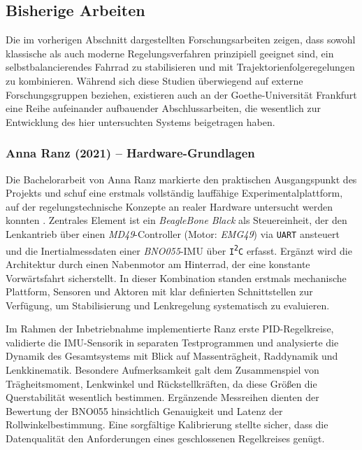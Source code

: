   \subsection{Bisherige Arbeiten}
  Die im vorherigen Abschnitt dargestellten Forschungsarbeiten zeigen, dass sowohl klassische 
  als auch moderne Regelungsverfahren prinzipiell geeignet sind, ein selbstbalancierendes 
  Fahrrad zu stabilisieren und mit Trajektorienfolgeregelungen zu kombinieren. Während sich 
  diese Studien überwiegend auf externe Forschungsgruppen beziehen, existieren auch an der 
  Goethe-Universität Frankfurt eine Reihe aufeinander aufbauender Abschlussarbeiten, die 
  wesentlich zur Entwicklung des hier untersuchten Systems beigetragen haben. 



  \subsubsection{Anna Ranz (2021) – Hardware-Grundlagen}

  Die Bachelorarbeit von Anna Ranz markierte den praktischen Ausgangspunkt des Projekts 
  und schuf eine erstmals vollständig lauffähige Experimentalplattform, auf der regelungstechnische Konzepte an realer Hardware untersucht werden konnten \citep{ranz2021bachelor}. Zentrales Element 
  ist ein \emph{BeagleBone Black} als Steuereinheit, der den Lenkantrieb über einen 
  \emph{MD49}-Controller (Motor: \emph{EMG49}) via \texttt{UART} ansteuert und die 
  Inertialmessdaten einer \emph{BNO055}-IMU über \texttt{I\textsuperscript{2}C} erfasst. 
  Ergänzt wird die Architektur durch einen Nabenmotor am Hinterrad, der eine konstante 
  Vorwärtsfahrt sicherstellt. In dieser Kombination standen erstmals mechanische Plattform, 
  Sensoren und Aktoren mit klar definierten Schnittstellen zur Verfügung, um Stabilisierung 
  und Lenkregelung systematisch zu evaluieren.
  
  Im Rahmen der Inbetriebnahme implementierte Ranz erste PID-Regelkreise, validierte die 
  IMU-Sensorik in separaten Testprogrammen und analysierte die Dynamik des Gesamtsystems 
  mit Blick auf Massenträgheit, Raddynamik und Lenkkinematik. Besondere Aufmerksamkeit 
  galt dem Zusammenspiel von Trägheitsmoment, Lenkwinkel und Rückstellkräften, da diese 
  Größen die Querstabilität wesentlich bestimmen. Ergänzende Messreihen dienten der
   Bewertung der BNO055 hinsichtlich Genauigkeit und Latenz der Rollwinkelbestimmung.
  Eine sorgfältige Kalibrierung stellte sicher, dass die Datenqualität den Anforderungen 
   eines geschlossenen Regelkreises genügt.
  
